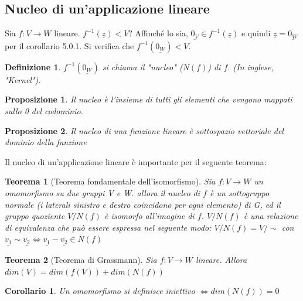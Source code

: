\documentclass[12pt]{article}
\newenvironment{para}{\begin{adjustwidth}{13mm}{}}{\end{adjustwidth}}
\newtheorem{Definizione}{Definizione}[subsection]
\newtheorem{Corollario}{Corollario}[subsection]
\newtheorem{Teorema}{Teorema}[subsection]
\newtheorem{Proposizione}{Proposizione}[subsection]
\begin{document}
\begin{para}
\subsection{Nucleo di un'applicazione lineare}
Sia $f:V \rightarrow W$ lineare. $f^{-1}(\underline{z}) < V$? Affinché lo sia, $\underline{0_V} \in f^{-1}(\underline{z})$ e quindi $\underline{z} = \underline{0_W}$ per il corollario 5.0.1. Si verifica che $f^{-1}(\underline{0_W})<V$.
\begin{Definizione}
        $f^{-1}(\underline{0_W})$ si chiama il "nucleo" ($N(f)$) di $f$. (In inglese, "Kernel").
\end{Definizione}
\begin{Proposizione}
    Il nucleo è l'insieme di tutti gli elementi che vengono mappati sullo 0 del codominio.
\end{Proposizione}
\begin{Proposizione}
    Il nucleo di una funzione lineare è sottospazio vettoriale del dominio della funzione
\end{Proposizione}
Il nucleo di un'applicazione lineare è importante per il seguente teorema:
\begin{Teorema}[Teorema fondamentale dell'isomorfismo]
    Sia $f:V \rightarrow W$ un omomorfismo su due gruppi V e W.  allora il nucleo di $f$ è un sottogruppo normale (i laterali sinistro e destro coincidono per ogni elemento) di G, ed il gruppo quoziente $V/N(f)$ è isomorfo all'imagine di $f$. $V/N(f)$ è una relazione di equivalenza che può essere espressa nel seguente modo:
    $V/N(f) = V/\sim$ con $\underline{v_1} \sim \underline{v_2} \Leftrightarrow \underline{v_1} - \underline{v_2} \in N(f)$
\end{Teorema}
\begin{Teorema}[Teorema di Grassmann]
    Sia $f:V \rightarrow W$ lineare. Allora $dim(V) = dim(f(V)) + dim(N(f))$
\end{Teorema}
\begin{Corollario}
    Un omomorfismo si definisce iniettivo $\Leftrightarrow dim(N(f))=0$ 
\end{Corollario}



\end{para}
\end{document}

